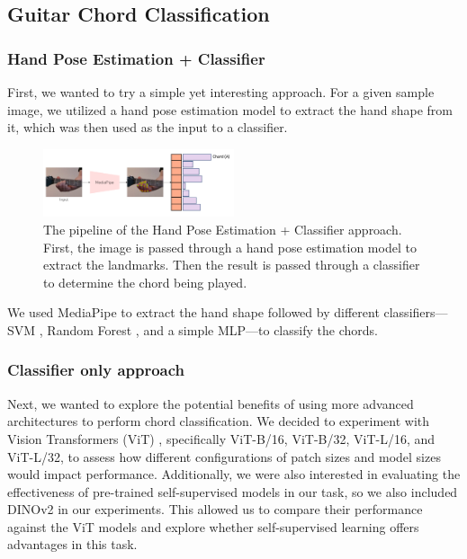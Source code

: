 \documentclass[10pt,twocolumn,letterpaper]{article}
\begin{document}

\subsection{Guitar Chord Classification}

\subsubsection{Hand Pose Estimation + Classifier}
First, we wanted to try a simple yet interesting approach. For a given sample image, we utilized a hand pose estimation model to extract the hand shape from it, which was then used as the input to a classifier.

\begin{figure}[h]
    \centering
    \includegraphics[width=0.5\textwidth]{images/final/hand_pose_estimation_classifier.png}
    \caption{The pipeline of the Hand Pose Estimation + Classifier approach. First, the image is passed through a hand pose estimation model to extract the landmarks. Then the result is passed through a classifier to determine the chord being played.}
    \label{fig:hand-pose-estimation-classifier}
\end{figure}

We used MediaPipe to extract the hand shape followed by different classifiers—SVM \cite{cortes1995support}, Random Forest \cite{ho1995random}, and a simple MLP—to classify the chords.

\subsubsection{Classifier only approach}
Next, we wanted to explore the potential benefits of using more advanced architectures to perform chord classification. We decided to experiment with Vision Transformers (ViT) \cite{dosovitskiy2020image}, specifically ViT-B/16, ViT-B/32, ViT-L/16, and ViT-L/32, to assess how different configurations of patch sizes and model sizes would impact performance. Additionally, we were also interested in evaluating the effectiveness of pre-trained self-supervised models in our task, so we also included DINOv2 \cite{oquab2023dinov2} in our experiments. This allowed us to compare their performance against the ViT models and explore whether self-supervised learning offers advantages in this task.
\end{document}
